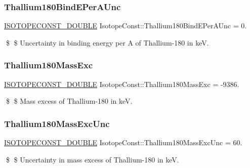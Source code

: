 \subsubsection{\texorpdfstring{Thallium180\+Bind\+E\+Per\+A\+Unc}{Thallium180BindEPerAUnc}}
{\footnotesize\ttfamily \mbox{\hyperlink{group___isotope_const-_macros_ga8f45a7272ce02c0b4c65c44636ed719a}{I\+S\+O\+T\+O\+P\+E\+C\+O\+N\+S\+T\+\_\+\+D\+O\+U\+B\+LE}} Isotope\+Const\+::\+Thallium180\+Bind\+E\+Per\+A\+Unc = 0.}

\$ \$ Uncertainty in binding energy per A of Thallium-\/180 in keV. \mbox{\label{group___isotope_const-_thallium-_tl180_gab002a79f2a16fe8e07b6c33a0bea72b9}} 
\subsubsection{\texorpdfstring{Thallium180\+Mass\+Exc}{Thallium180MassExc}}
{\footnotesize\ttfamily \mbox{\hyperlink{group___isotope_const-_macros_ga8f45a7272ce02c0b4c65c44636ed719a}{I\+S\+O\+T\+O\+P\+E\+C\+O\+N\+S\+T\+\_\+\+D\+O\+U\+B\+LE}} Isotope\+Const\+::\+Thallium180\+Mass\+Exc = -\/9386.}

\$ \$ Mass excess of Thallium-\/180 in keV. \mbox{\label{group___isotope_const-_thallium-_tl180_ga1da294eb62a8ec08abeff896016a2cf9}} 
\subsubsection{\texorpdfstring{Thallium180\+Mass\+Exc\+Unc}{Thallium180MassExcUnc}}
{\footnotesize\ttfamily \mbox{\hyperlink{group___isotope_const-_macros_ga8f45a7272ce02c0b4c65c44636ed719a}{I\+S\+O\+T\+O\+P\+E\+C\+O\+N\+S\+T\+\_\+\+D\+O\+U\+B\+LE}} Isotope\+Const\+::\+Thallium180\+Mass\+Exc\+Unc = 60.}

\$ \$ Uncertainty in mass excess of Thallium-\/180 in keV. \mbox{\label{group___isotope_const-_thallium-_tl180_gad381c677e8e5c9aab03b11609a1dd8db}} 
